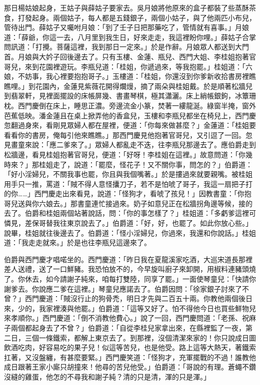 那日楊姑娘起身，王姑子與薛姑子要家去。吳月娘將他原來的盒子都裝了些蒸酥茶食，打發起身。兩個姑子，每人都是五錢銀子，兩個小姑子，與了他兩匹小布兒，管待出門。薛姑子又囑咐月娘：「到了壬子日把那藥吃了，管情就有喜事。」月娘道：「薛爺，你這一去，八月里到我生日，好來走走，我這裡盼你哩。」薛姑子合掌問訊道：「打攪。菩薩這裡，我到那日一定來。」於是作辭。月娘眾人都送到大門首。月娘與大妗子回後邊去了。只有玉樓、金蓮、瓶兒、西門大姐、李桂姐抱著官哥兒，來到花園裡遊玩。李瓶兒道：「桂姐，你遞過來，等我抱罷。」桂姐道：「六娘，不妨事，我心裡要抱抱哥子。」玉樓道：「桂姐，你還沒到你爹新收拾書房裡瞧瞧哩。」到花園內，金蓮見紫薇花開得爛熳，摘了兩朵與桂姐戴。於是順著松牆兒到翡翠軒，見裡面擺設的床帳屏幾、書畫琴棋，極其瀟灑。床上綃帳銀鉤，冰簟珊枕。西門慶倒在床上，睡思正濃。旁邊流金小篆，焚著一縷龍涎。綠窗半掩，窗外芭蕉低映。潘金蓮且在桌上掀弄他的香盒兒，玉樓和李瓶兒都坐在椅兒上，西門慶忽翻過身來，看剛見眾婦人都在屋裡，便道：「你每來做甚麼？」金蓮道：「桂姐要看看你的書房，俺每引他來瞧瞧。」那西門慶見他抱著官哥兒，又引逗了一回。忽見畫童來說：「應二爹來了。」眾婦人都亂走不迭，往李瓶兒那邊去了。應伯爵走到松牆邊，看見桂姐抱著官哥兒，便道：「好呀！李桂姐在這裡。」故意問道：「你幾時來？」那桂姐走了，說道：「罷麼，怪花子！又不關你事，問怎的？」伯爵道：「好小淫婦兒，不關我事也罷，你且與我個嘴著。」於是摟過來就要親嘴。被桂姐用手只一推，罵道：「賊不得人意怪攮刀子，若不是怕唬了哥子，我這一扇把子打的你……」西門慶走出來看見，說道：「怪狗才，看唬了孩兒！」因教書童：「你抱哥兒送與你六娘去。」那書童連忙接過來。奶子如意兒正在松牆拐角邊等候，接的去了。伯爵和桂姐兩個站著說話，問：「你的事怎樣了？」桂姐道：「多虧爹這裡可憐見，差保哥替我往東京說去了。」伯爵道：「好，好，也罷了。如此你放心些。」說畢，桂姐就往後邊去了。伯爵道：「怪小淫婦兒，你過來，我還和你說話。」桂姐道：「我走走就來。」於是也往李瓶兒這邊來了。

伯爵與西門慶才唱喏坐的。西門慶道：「昨日我在夏龍溪家吃酒，大巡宋道長那裡差人送禮，送了一口鮮豬。我恐怕放不的，今早旋叫廚子來卸開，用椒料連豬頭燒了。你休去，如今請謝子純來，咱每打雙陸，同享了罷。」一面使琴童兒：「快請你謝爹去。你說應二爹在這裡。」琴童兒應諾去了。伯爵因問：「徐家銀子討來了不曾？」西門慶道：「賊沒行止的狗骨禿，明日才先與二百五十兩。你教他兩個後日來，少的，我家裡湊與他罷。」伯爵道：「這等又好了。怕不得他今日也買些鮮物兒來孝順你。」西門慶道：「倒不消教他費心。」說了一回，西門慶問道：「老孫、祝麻子兩個都起身去了不曾？」伯爵道：「自從李桂兒家拿出來，在縣裡監了一夜，第二日，三個一條鐵索，都解上東京去了。到那裡，沒個清潔來家的！你只說成日圖飲酒吃肉，好容易吃的果子兒！似這等苦兒，也是他受。路上這等大熱天，著鐵索扛著，又沒盤纏，有甚麼要緊。」西門慶笑道：「怪狗才，充軍擺戰的不過！誰教他成日跟著王家小廝只胡撞來！他尋的苦兒他受。」伯爵道：「哥說的有理。蒼蠅不鑽沒縫的雞蛋，他怎的不尋我和謝子純？清的只是清，渾的只是渾。」


